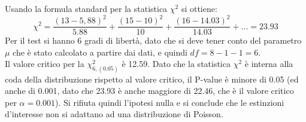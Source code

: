 \documentclass[drafts, 10pt]{book}
\newcounter{example}[section]
\begin{document}
\begin{example}
\begin{table}[H]
\begin{tabular}{c|c|c}
        \hline
        \end{tabular}
        \caption{}
        \label{tabestinzioni2}
\end{table}\noindent
Usando la formula standard per la statistica $\chi^2$ si ottiene:
\begin{equation}
\chi^2 = \frac{(13-5,88)^2}{5.88}+\frac{(15-10)^2}{10}+\frac{(16-14.03)^2}{14.03}+... = 23.93
\end{equation}
Per il test si hanno 6 gradi di libertà, dato che si deve tener conto del parametro $\mu$ che è stato calcolato a partire dai dati, e quindi $df = 8-1-1=6$.
\\
Il valore critico per la $\chi^2_{6,(0.05)}$ è 12.59. Dato che la statistica $\chi^2$ è interna alla coda della distribuzione rispetto al valore critico, il P-value è minore di 0.05 (ed anche di 0.001, dato che 23.93 è anche maggiore di 22.46, che è il valore critico per $\alpha = 0.001$). Si rifiuta quindi l'ipotesi nulla e si conclude che le estinzioni d'interesse non si adattano ad una distribuzione di Poisson.
\end{example}

\end{document}
